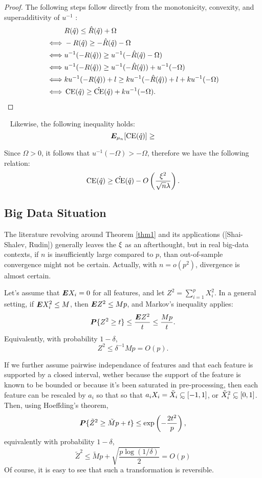 \begin{proof}
  The following steps follow directly from the monotonicity, convexity, and
  superadditivity of $u^{-1}$ :
  \begin{align*}
    & R(\hat q) \leq \hat R(\hat q) + \Omega\\
    \iff & -R(\hat q) \geq -\hat R(\hat q) - \Omega\\
    \iff & u^{-1}(-R(\hat q)) \geq u^{-1}(-\hat R(\hat q) - \Omega)\\
    \iff & u^{-1}(-R(\hat q)) \geq u^{-1}(-\hat R(\hat q)) + u^{-1}(-\Omega)\\
    \iff & ku^{-1}(-R(\hat q))+l \geq ku^{-1}(-\hat R(\hat q))+l + ku^{-1}(-\Omega)\\
    \iff & \operatorname{CE}(\hat q) \geq \hat{\operatorname{CE}}(\hat q) + ku^{-1}(-\Omega).\qedhere
  \end{align*}
\end{proof}

\begin{thm}\
  \label{thm4}
  Likewise, the following inequality holds:
  \[
    \bm E_{\mu_n}[\operatorname{CE}(\hat q)] \geq 
  \]
\end{thm}

Since $\Omega>0$, it follows that $u^{-1}(-\Omega) > -\Omega$, therefore we have the
following relation:
\[
  \operatorname{CE}(\hat q) \geq \hat{\operatorname{CE}}(\hat q) - O\left(\frac{\xi^2}{\sqrt{n}\lambda}\right).
\]


\subsection{Big Data Situation}

The literature revolving around Theorem \ref{thm1} and its applications ([Shai-Shalev,
Rudin]) generally leaves the $\xi$ as an afterthought, but in real big-data contexts, if
$n$ is insufficiently large compared to $p$, than out-of-sample convergence might not be
certain. Actually, with $n=o(p^2)$, divergence is almost certain. 

Let's assume that $\bm E X_i = 0$ for all features, and let $Z^2 = \sum_{i=1}^p X_i^2$. In a
general setting, if $\bm E X_i^2 \leq M$, then $\bm E Z^2 \leq Mp$, and Markov's inequality
applies:
\[
  \bm P\{Z^2 \geq t\} \leq \frac{\bm E Z^2}{t} \leq \frac{Mp}{t}.
\]
Equivalently, with probability $1-\delta$, 
\[
  Z^2 \leq \delta^{-1}Mp = O(p).
\]

If we further assume pairwise independance of features and that each feature is supported
by a closed interval, wether because the support of the feature is known to be bounded or
because it's been saturated in pre-processing, then each feature can be rescaled by $a_i$
so that so that $a_iX_i = \tilde X_i \subsetsim[-1,1]$, or $\tilde X_i^2
\subsetsim[0,1]$. Then, using Hoeffding's theorem,
\[
  \bm P\{\tilde Z^2 \geq \tilde Mp + t\} \leq \exp\left(-\frac{2t^2}{p}\right),
\]
equivalently with probability $1-\delta$, 
\[
  \tilde Z^2 \leq \tilde Mp + \sqrt{\frac{p\log(1/\delta)}{2}} = O(p)
\]
Of course, it is easy to see that such a transformation is reversible. 

